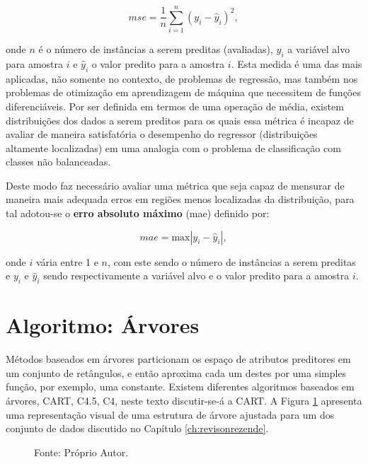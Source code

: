 \begin{equation}\label{eq:mse}
mse=\frac{1}{n}\sum_{i=1}^n(y_i-\hat{y}_i)^2\mbox{,}~
\end{equation}

onde $n$ é o número de instâncias a serem preditas (avaliadas), $y_i$ a variável alvo para amostra $i$ e $\hat{y}_i$ o valor predito para a amostra $i$. Esta medida é uma das mais aplicadas, não somente no contexto, de problemas de regressão, mas também nos problemas de otimização em aprendizagem de máquina que necessitem de funções diferenciáveis. Por ser definida em termos de uma operação de média, existem distribuições dos dados a serem preditos para os quais essa métrica é incapaz de avaliar de maneira satisfatória o desempenho do regressor (distribuições altamente localizadas) em uma analogia com o problema de classificação com classes não balanceadas. 

Deste modo faz necessário avaliar uma métrica que seja capaz de mensurar de maneira mais adequada erros em regiões menos localizadas da distribuição, para tal adotou-se o {\bf erro absoluto máximo} (mae) definido por:

\begin{equation}
mae=\mbox{max}|y_{i}-\hat{y}_i|\mbox{,}~
\end{equation}

onde $i$ vária entre 1 e $n$, com este sendo o número de instâncias a serem preditas e $y_i$ e $\hat{y}_i$ sendo respectivamente a variável alvo e o valor predito para a amostra $i$.

\section{Algoritmo: Árvores}

Métodos baseados em árvores particionam os espaço de atributos preditores em um conjunto de retângulos, e então aproxima cada um destes por uma simples função, por exemplo, uma constante. Existem diferentes algoritmos baseados em árvores, CART, C4.5, C4, neste texto discutir-se-á a CART. A Figura \ref{fig:tree} apresenta uma representação visual de uma estrutura de árvore ajustada para um dos conjunto de dados discutido no Capítulo \ref{ch:revisonrezende}.

\begin{figure}[H]
\centering
{}
\caption{Fonte: Próprio Autor.}
\label{fig:tree}
\end{figure}


